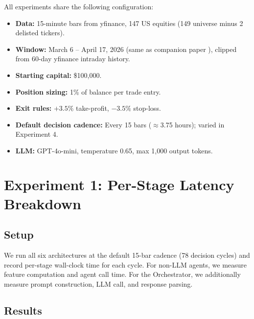 \documentclass[10pt,conference]{IEEEtran}
\begin{document}
All experiments share the following configuration:
\begin{itemize}
    \item \textbf{Data:} 15-minute bars from yfinance, 147 US equities (149 universe minus 2 delisted tickers).
    \item \textbf{Window:} March 6 -- April 17, 2026 (same as companion paper \cite{companion}), clipped from 60-day yfinance intraday history.
    \item \textbf{Starting capital:} \$100,000.
    \item \textbf{Position sizing:} 1\% of balance per trade entry.
    \item \textbf{Exit rules:} $+3.5\%$ take-profit, $-3.5\%$ stop-loss.
    \item \textbf{Default decision cadence:} Every 15 bars ($\approx$3.75 hours); varied in Experiment 4.
    \item \textbf{LLM:} GPT-4o-mini, temperature 0.65, max 1,000 output tokens.
\end{itemize}


\section{Experiment 1: Per-Stage Latency Breakdown}
\label{sec:exp1}

\subsection{Setup}

We run all six architectures at the default 15-bar cadence (78 decision cycles) and record per-stage wall-clock time for each cycle. For non-LLM agents, we measure feature computation and agent call time. For the Orchestrator, we additionally measure prompt construction, LLM call, and response parsing.

\subsection{Results}
\end{document}
